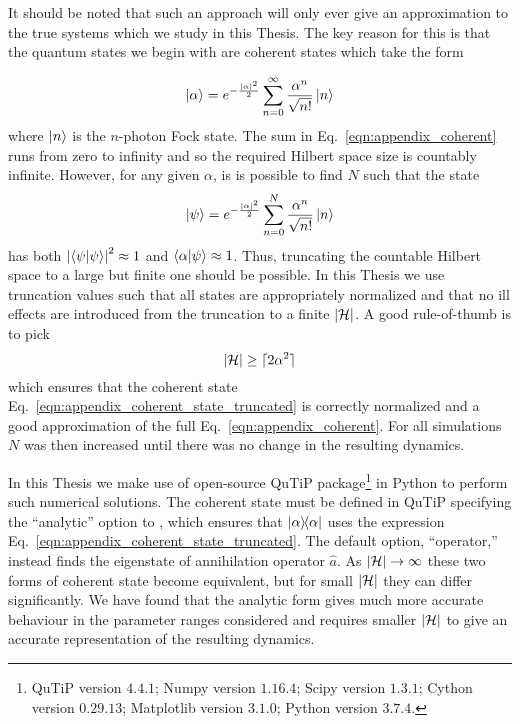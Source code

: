 It should be noted that such an approach will only ever give an approximation to the true systems which we study in this Thesis. The key reason for this is that the quantum states we begin with are coherent states which take the form

\begin{equation}\label{eqn:appendix_coherent}
\ket{\alpha} = e^{-\frac{\left|\alpha\right|^2}{2}}\sum_{n=0}^\infty \frac{\alpha^n}{\sqrt{n!}}\ket{n}
\end{equation}
where $\ket{n}$ is the $n$-photon Fock state. %
The sum in Eq.~\ref{eqn:appendix_coherent} runs from zero to infinity and so the required Hilbert space size is countably infinite. However, for any given $\alpha$, is is possible to find $N$ such that the state
\begin{equation}\label{eqn:appendix_coherent_state_truncated}
\ket{\psi} = e^{-\frac{\left|\alpha\right|^2}{2}}\sum_{n=0}^N \frac{\alpha^n}{\sqrt{n!}}\ket{n}
\end{equation} 
has both $\left| \ip{\psi} \right|^2 \approx 1$ and $\ip{\alpha}{\psi} \approx 1$. Thus, truncating the countable Hilbert space to a large but finite one should be possible. In this Thesis we use truncation values such that all states are appropriately normalized and that no ill effects are introduced from the truncation to a finite $\left|\mathcal{H}\right|$. A good rule-of-thumb is to pick
\begin{equation}\label{eqn:rule_of_thumb}
\left|\mathcal{H}\right| \ge \lceil 2 \alpha^2 \rceil
\end{equation}
which ensures that the coherent state Eq.~\ref{eqn:appendix_coherent_state_truncated} is correctly normalized and a good approximation of the full Eq.~\ref{eqn:appendix_coherent}. For all simulations $N$ was then increased until there was no change in the resulting dynamics.

In this Thesis we make use of open-source QuTiP package\footnote{QuTiP version $4.4.1$; Numpy version $1.16.4$; Scipy version $1.3.1$; Cython version $0.29.13$; Matplotlib version $3.1.0$; Python version $3.7.4$.} \cite{qutip2} in Python to perform such numerical solutions. The coherent state must be defined in QuTiP specifying the ``analytic'' option to , which ensures that $\dyad{\alpha}$ uses the expression Eq.~\ref{eqn:appendix_coherent_state_truncated}. The default option, ``operator,'' instead finds the eigenstate of annihilation operator $\hat{a}$. As $\left|\mathcal{H}\right| \rightarrow \infty$ these two forms of coherent state become equivalent, but for small $\left|\mathcal{H}\right|$ they can differ significantly. We have found that the analytic form gives much more accurate behaviour in the parameter ranges considered and requires smaller $\left|\mathcal{H}\right|$ to give an accurate representation of the resulting dynamics.


